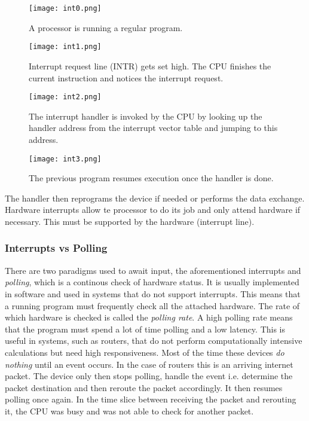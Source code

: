 \begin{figure}
\begin{center}
\texttt{[image: int0.png]}
\caption{A processor is running a regular program.}
\end{center}
\end{figure}

\begin{figure}
\begin{center}
\texttt{[image: int1.png]}
\caption{Interrupt request line (INTR) gets set high. The CPU finishes the current instruction and notices the interrupt request.}
\end{center}
\end{figure}

\begin{figure}
\begin{center}
\texttt{[image: int2.png]}
\caption{The interrupt handler is invoked by the CPU by looking up the handler address from the
interrupt vector table and jumping to this address.}
\end{center}
\end{figure}

\begin{figure}
\begin{center}
\texttt{[image: int3.png]}
\caption{The previous program resumes execution once the handler is done. }
\end{center}
\end{figure}


The handler then reprograms the device if needed or performs the data exchange. Hardware 
interrupts allow te processor to do its job and only attend hardware if necessary. This
must be supported by the hardware (interrupt line).

\subsubsection{Interrupts vs Polling}

There are two paradigms used to await input, the aforementioned interrupts and \textit{polling}, 
which is a continous check of hardware status. It is usually implemented in software and 
used in systems that do not support interrupts. This means that a running program must 
frequently check all the attached hardware. The rate of which hardware is checked is called 
the \textit{polling rate}. A high polling rate means that the program must spend a lot of time 
polling and a low latency. This is useful in systems, such as routers, that do not perform 
computationally intensive calculations but need high responsiveness. Most of the time these 
devices \textit{do nothing} until an event occurs. In the case of routers this is an arriving 
internet packet. The device only then stops polling, handle the event i.e. determine 
the packet destination and then reroute the packet accordingly. It then resumes polling once 
again. In the time slice between receiving the packet and rerouting it, the CPU was busy and
was not able to check for another packet. 

